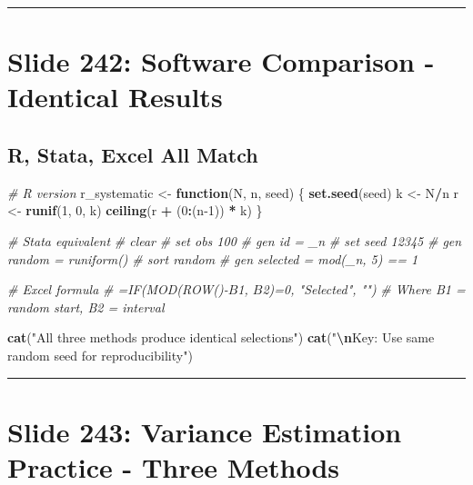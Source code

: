 \documentclass[
]{article}
\newenvironment{Shaded}{\begin{snugshade}}{\end{snugshade}}
\newcommand{\CommentTok}[1]{\textcolor[rgb]{0.56,0.35,0.01}{\textit{#1}}}
\newcommand{\ControlFlowTok}[1]{\textcolor[rgb]{0.13,0.29,0.53}{\textbf{#1}}}
\newcommand{\DecValTok}[1]{\textcolor[rgb]{0.00,0.00,0.81}{#1}}
\newcommand{\FunctionTok}[1]{\textcolor[rgb]{0.13,0.29,0.53}{\textbf{#1}}}
\newcommand{\NormalTok}[1]{#1}
\newcommand{\OtherTok}[1]{\textcolor[rgb]{0.56,0.35,0.01}{#1}}
\newcommand{\SpecialCharTok}[1]{\textcolor[rgb]{0.81,0.36,0.00}{\textbf{#1}}}
\newcommand{\StringTok}[1]{\textcolor[rgb]{0.31,0.60,0.02}{#1}}
\begin{document}
\begin{center}\rule{0.5\linewidth}{0.5pt}\end{center}

\section{Slide 242: Software Comparison - Identical
Results}\label{slide-242-software-comparison---identical-results}

\subsection{R, Stata, Excel All Match}\label{r-stata-excel-all-match}

\begin{Shaded}
\begin{Highlighting}[]
\CommentTok{\# R version}
\NormalTok{r\_systematic }\OtherTok{\textless{}{-}} \ControlFlowTok{function}\NormalTok{(N, n, seed) \{}
  \FunctionTok{set.seed}\NormalTok{(seed)}
\NormalTok{  k }\OtherTok{\textless{}{-}}\NormalTok{ N}\SpecialCharTok{/}\NormalTok{n}
\NormalTok{  r }\OtherTok{\textless{}{-}} \FunctionTok{runif}\NormalTok{(}\DecValTok{1}\NormalTok{, }\DecValTok{0}\NormalTok{, k)}
  \FunctionTok{ceiling}\NormalTok{(r }\SpecialCharTok{+}\NormalTok{ (}\DecValTok{0}\SpecialCharTok{:}\NormalTok{(n}\DecValTok{{-}1}\NormalTok{)) }\SpecialCharTok{*}\NormalTok{ k)}
\NormalTok{\}}

\CommentTok{\# Stata equivalent}
\CommentTok{\# clear}
\CommentTok{\# set obs 100}
\CommentTok{\# gen id = \_n}
\CommentTok{\# set seed 12345}
\CommentTok{\# gen random = runiform()}
\CommentTok{\# sort random}
\CommentTok{\# gen selected = mod(\_n, 5) == 1}

\CommentTok{\# Excel formula}
\CommentTok{\# =IF(MOD(ROW(){-}$B$1, $B$2)=0, "Selected", "")}
\CommentTok{\# Where B1 = random start, B2 = interval}

\FunctionTok{cat}\NormalTok{(}\StringTok{"All three methods produce identical selections"}\NormalTok{)}
\FunctionTok{cat}\NormalTok{(}\StringTok{"}\SpecialCharTok{\textbackslash{}n}\StringTok{Key: Use same random seed for reproducibility"}\NormalTok{)}
\end{Highlighting}
\end{Shaded}

\begin{center}\rule{0.5\linewidth}{0.5pt}\end{center}

\section{Slide 243: Variance Estimation Practice - Three
Methods}\label{slide-243-variance-estimation-practice---three-methods}
\end{document}
